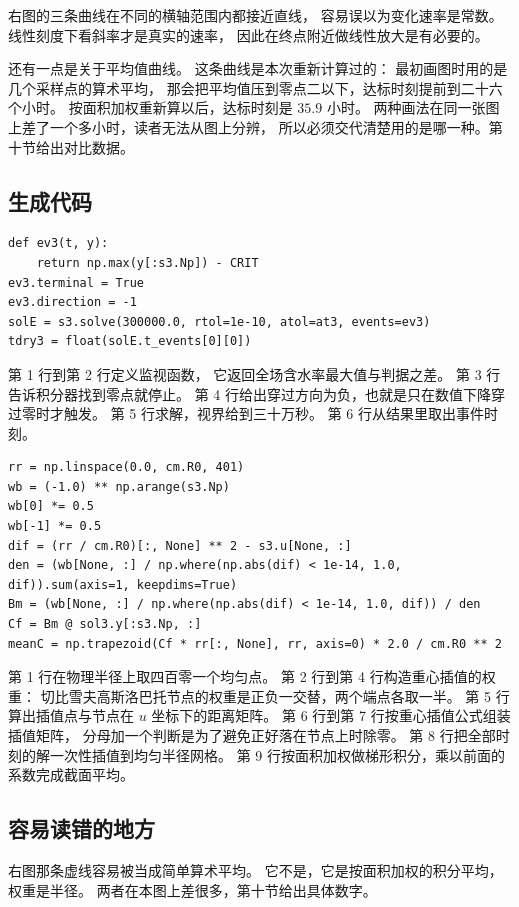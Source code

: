 \documentclass[11pt,a4paper]{article}
\begin{document}
右图的三条曲线在不同的横轴范围内都接近直线，
容易误以为变化速率是常数。
线性刻度下看斜率才是真实的速率，
因此在终点附近做线性放大是有必要的。

还有一点是关于平均值曲线。
这条曲线是本次重新计算过的：
最初画图时用的是几个采样点的算术平均，
那会把平均值压到零点二以下，达标时刻提前到二十六个小时。
按面积加权重新算以后，达标时刻是 $35.9$ 小时。
两种画法在同一张图上差了一个多小时，读者无法从图上分辨，
所以必须交代清楚用的是哪一种。第十节给出对比数据。

\subsection{生成代码}

\begin{lstlisting}
def ev3(t, y):
    return np.max(y[:s3.Np]) - CRIT
ev3.terminal = True
ev3.direction = -1
solE = s3.solve(300000.0, rtol=1e-10, atol=at3, events=ev3)
tdry3 = float(solE.t_events[0][0])
\end{lstlisting}

第 1 行到第 2 行定义监视函数，
它返回全场含水率最大值与判据之差。
第 3 行告诉积分器找到零点就停止。
第 4 行给出穿过方向为负，也就是只在数值下降穿过零时才触发。
第 5 行求解，视界给到三十万秒。
第 6 行从结果里取出事件时刻。

\begin{lstlisting}
rr = np.linspace(0.0, cm.R0, 401)
wb = (-1.0) ** np.arange(s3.Np)
wb[0] *= 0.5
wb[-1] *= 0.5
dif = (rr / cm.R0)[:, None] ** 2 - s3.u[None, :]
den = (wb[None, :] / np.where(np.abs(dif) < 1e-14, 1.0, dif)).sum(axis=1, keepdims=True)
Bm = (wb[None, :] / np.where(np.abs(dif) < 1e-14, 1.0, dif)) / den
Cf = Bm @ sol3.y[:s3.Np, :]
meanC = np.trapezoid(Cf * rr[:, None], rr, axis=0) * 2.0 / cm.R0 ** 2
\end{lstlisting}

第 1 行在物理半径上取四百零一个均匀点。
第 2 行到第 4 行构造重心插值的权重：
切比雪夫高斯洛巴托节点的权重是正负一交替，两个端点各取一半。
第 5 行算出插值点与节点在 $u$ 坐标下的距离矩阵。
第 6 行到第 7 行按重心插值公式组装插值矩阵，
分母加一个判断是为了避免正好落在节点上时除零。
第 8 行把全部时刻的解一次性插值到均匀半径网格。
第 9 行按面积加权做梯形积分，乘以前面的系数完成截面平均。

\subsection{容易读错的地方}

右图那条虚线容易被当成简单算术平均。
它不是，它是按面积加权的积分平均，权重是半径。
两者在本图上差很多，第十节给出具体数字。
\end{document}

